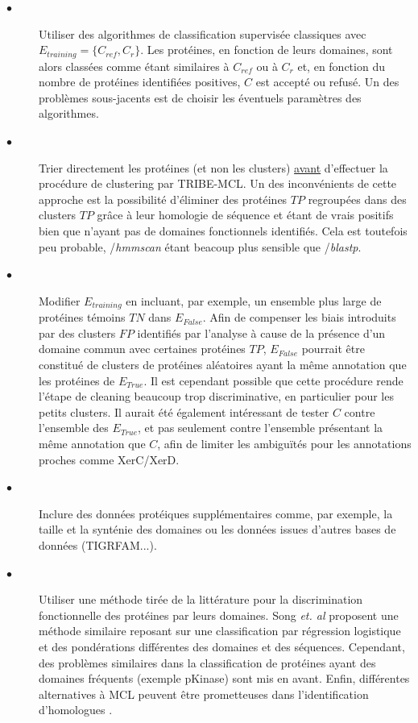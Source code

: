 \begin{description}
	\item[$\bullet$] Utiliser des algorithmes de classification supervisée classiques avec $E_{training}=\{C_{ref},C_{r}\}$. Les protéines, en fonction de leurs domaines, sont alors classées comme étant similaires à $C_{ref}$ ou à $C_{r}$ et, en fonction du nombre de protéines identifiées positives, $C$ est accepté ou refusé. Un des problèmes sous-jacents est de choisir les éventuels paramètres des algorithmes.
	\item[$\bullet$] Trier directement les protéines (et non les clusters) \underline{avant} d'effectuer la procédure de clustering par TRIBE-MCL. Un des inconvénients de cette approche est la possibilité d'éliminer des protéines $TP$ regroupées dans des clusters $TP$ grâce à leur homologie de séquence et étant de vrais positifs bien que n'ayant pas de domaines fonctionnels identifiés. Cela est toutefois peu probable, /\textit{hmmscan} étant beacoup plus sensible que /\textit{blastp}.
	\item[$\bullet$] Modifier $E_{training}$ en incluant, par exemple, un ensemble plus large de protéines témoins $TN$ dans $E_{False}$. Afin de compenser les biais introduits par des clusters $FP$ identifiés par l'analyse à cause de la présence d'un domaine commun avec certaines protéines $TP$,  $E_{False}$ pourrait être constitué de clusters de protéines aléatoires ayant la même annotation que les protéines de $E_{True}$. Il est cependant possible que cette procédure rende l'étape de cleaning beaucoup trop discriminative, en particulier pour les petits clusters. Il aurait été également intéressant de tester $C$ contre l'ensemble des $E_{True}$, et pas seulement contre l'ensemble présentant la même annotation que $C$, afin de  limiter les ambiguïtés pour les annotations proches comme XerC/XerD. 
	\item[$\bullet$] Inclure des données protéiques supplémentaires comme, par exemple, la taille et la synténie des domaines ou les données issues d'autres bases de données (TIGRFAM...).
	\item[$\bullet$] Utiliser une méthode tirée de la littérature pour la discrimination fonctionnelle des protéines par leurs domaines. Song \textit{et. al} \citep{song2008sequence} proposent une méthode similaire reposant sur une classification par régression logistique et des pondérations différentes des domaines et des séquences. Cependant, des problèmes similaires dans la classification de protéines ayant des domaines fréquents (exemple pKinase) sont mis en avant. Enfin, différentes alternatives à MCL peuvent être prometteuses dans l'identification d'homologues \citep{Terrapon2014}.
\end{description}

